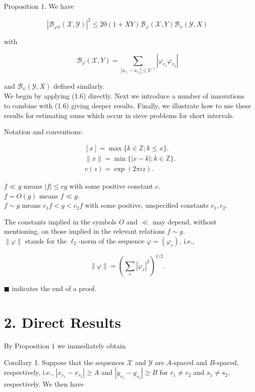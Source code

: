 \documentclass[10pt]{article}
\begin{document}
Proposition 1. We have


\begin{equation*}
\left|\mathscr{B}_{\varphi \psi}(\mathscr{X}, \mathscr{Y})\right|^{2} \leqslant 20(1+X Y) \mathscr{B}_{\varphi}(\mathscr{X}, Y) \mathscr{B}_{\psi}(\mathscr{Y}, X) \tag{1.6}
\end{equation*}


with

$$
\mathscr{B}_{\varphi}(\mathscr{X}, Y)=\sum_{\left|x_{r_{1}}-x_{r_{2}}\right| \leqslant Y^{-1}}\left|\varphi_{r_{1}} \varphi_{r_{2}}\right|
$$

and $\mathscr{B}_{\psi}(\mathscr{Y}, X)$ defined similarly.\\
We begin by applying (1.6) directly. Next we introduce a number of innovations to combine with (1.6) giving deeper results. Finally, we illustrate how to use these results for estimating sums which occur in sieve problems for short intervals.

Notation and conventions:

$$
\begin{aligned}
& {[x]=\max \{k \in \mathbb{Z} ; k \leqslant x\} .} \\
& \|x\|=\min \{|x-k| ; k \in \mathbb{Z}\} . \\
& e(z)=\exp (2 \pi i z) .
\end{aligned}
$$

$f \ll g$ means $|f| \leqslant c g$ with some positive constant $c$.\\
$f=O(g)$ means $f \ll g$.\\
$f \sim g$ means $c_{1}f<g<c_{2}f$ with some positive, unspecified constants $c_{1}, c_{2}$.

The constants implied in the symbols $O$ and $\ll$ may depend, without mentioning, on those implied in the relevant relations $f \sim g$.\\
$\|\varphi\|$ stands for the $\ell_{2}$-norm of the sequence $\varphi=\left(\varphi_{r}\right)$, i.e.,

$$
\|\varphi\|=\left(\sum_{r}\left|\varphi_{r}\right|^{2}\right)^{1 / 2} .
$$

\(\blacksquare\) indicates the end of a proof.

\section*{2. Direct Results}
By Proposition 1 we immediately obtain

Corollary 1. Suppose that the sequences $\mathscr{X}$ and $\mathscr{Y}$ are $A$-spaced and $B$-spaced, respectively, i.e., $\left|x_{r_{1}}-x_{r_{2}}\right| \geqslant A$ and $\left|y_{s_{1}}-y_{s_{2}}\right| \geqslant B$ for $r_{1} \neq r_{2}$ and $s_{1} \neq s_{2}$, respectively. We then have
\end{document}
